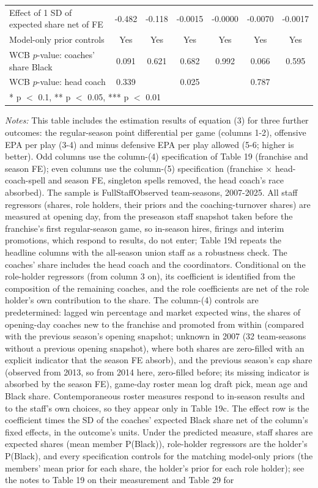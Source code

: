 \begin{table}[H]
{\begin{tabular}[t]{lcccccc}
Effect of 1 SD of expected share net of FE & -0.482 & -0.118 & -0.0015 & -0.0000 & -0.0070 & -0.0017\\
Model-only prior controls & Yes & Yes & Yes & Yes & Yes & Yes\\
WCB $p$-value: coaches' share Black & 0.091 & 0.621 & 0.682 & 0.992 & 0.066 & 0.595\\
WCB $p$-value: head coach & 0.339 &  & 0.025 &  & 0.787 & \\
\bottomrule
\multicolumn{7}{l}{\rule{0pt}{1em}* p $<$ 0.1, ** p $<$ 0.05, *** p $<$ 0.01}\\
\end{tabular}}
\end{table}

{\footnotesize
\noindent\textit{Notes:} This table includes the estimation results of equation (3) for three further outcomes: the regular-season point differential per game (columns 1-2), offensive EPA per play (3-4) and minus defensive EPA per play allowed (5-6; higher is better). Odd columns use the column-(4) specification of Table 19 (franchise and season FE); even columns use the column-(5) specification (franchise $\times$ head-coach-spell and season FE, singleton spells removed, the head coach's race absorbed). The sample is FullStaffObserved team-seasons, 2007-2025. All staff regressors (shares, role holders, their priors and the coaching-turnover shares) are measured at opening day, from the preseason staff snapshot taken before the franchise's first regular-season game, so in-season hires, firings and interim promotions, which respond to results, do not enter; Table 19d repeats the headline columns with the all-season union staff as a robustness check. The coaches' share includes the head coach and the coordinators. Conditional on the role-holder regressors (from column 3 on), its coefficient is identified from the composition of the remaining coaches, and the role coefficients are net of the role holder's own contribution to the share. The column-(4) controls are predetermined: lagged win percentage and market expected wins, the shares of opening-day coaches new to the franchise and promoted from within (compared with the previous season's opening snapshot; unknown in 2007 (32 team-seasons without a previous opening snapshot), where both shares are zero-filled with an explicit indicator that the season FE absorb), and the previous season's cap share (observed from 2013, so from 2014 here, zero-filled before; its missing indicator is absorbed by the season FE), game-day roster mean log draft pick, mean age and Black share. Contemporaneous roster measures respond to in-season results and to the staff's own choices, so they appear only in Table 19c. The effect row is the coefficient times the SD of the coaches' expected Black share net of the column's fixed effects, in the outcome's units. Under the predicted measure, staff shares are expected shares (mean member P(Black)), role-holder regressors are the holder's P(Black), and every specification controls for the matching model-only priors (the members' mean prior for each share, the holder's prior for each role holder); see the notes to Table 19 on their measurement and Table 29 for }
